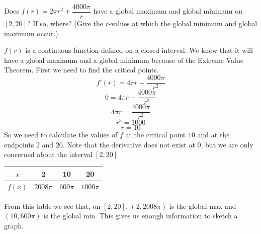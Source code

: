 \documentclass{article}
\begin{document}
\begin{enumerate}
\begin{enumerate}
    \begin{problem}[\vfill]
      Does $f(r) = 2 \pi r^2 + \dfrac{4000 \pi}{r}$ have a global maximum and global minimum on $[2, 20]$? If so, where? (Give the $r$-values at which the global minimum and global maximum occur.)
    \end{problem}

    \begin{solution}
      $f(r)$ is a continuous function defined on a closed interval. We know that it will have a global maximum and a global minimum because of the {Extreme Value Theorem}. First
      we need to find the critical points.
        $$f'(r) = 4 \pi r - \frac{4000 \pi} {r^2}$$
        $$ 0  =4 \pi r - \frac{4000 \pi} {r^2}$$
        $$ 4 \pi r = \frac{4000 \pi} {r^2}$$
        $$ r^3 = 1000$$ 
        $$ r =10$$ 
        So we need to calculate the values of $f$ at the critical point $10$ and 
        at the endpoints $2$ and $20$. 
        Note that the derivative does not exist at $0$, but we are only concerned about the 
        interval $[2,20]$
        \begin{center} 
          \begin{tabular} {c || c | c| c } 
            $x$ & 2 & 10 & 20  \\ 
            \hline 
            $f(x)$ &$2008 \pi$ &$600 \pi$  &$1000 \pi$ 
          \end{tabular} 
        \end{center} 
        From this table we see that, on $[2, 20]$,
        $(2,2008 \pi)$ is the global max and $(10, 600 \pi)$ is the global min. 
        This gives us enough information to sketch a graph. 
      \begin{center} 
      \end{center} 
    \end{solution}


\end{enumerate}
\end{enumerate}
\end{document}
